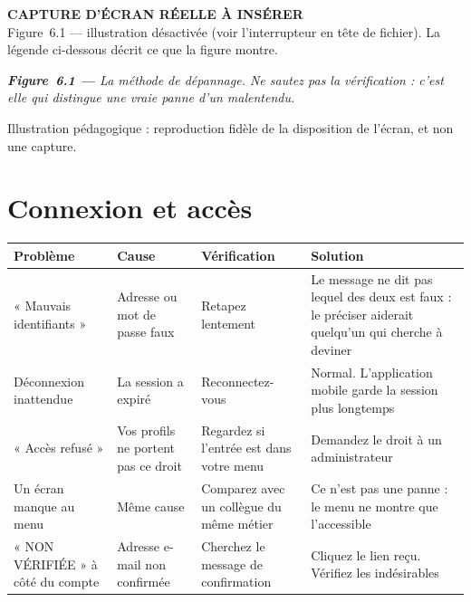 \documentclass[11pt,a4paper]{report}
\newif\ifillustrations
\newcounter{etape}[section]
\newcommand{\captureAInserer}[2][3.4cm]{%
  \begin{center}
  \begin{tcolorbox}[width=\linewidth,height=#1,
    colback=garahFond,colframe=garahAttenue,boxrule=0.9pt,arc=4pt,
    halign=center,valign=center]
    {\small\bfseries\color{garahAttenue}CAPTURE D'ÉCRAN RÉELLE À INSÉRER}\\[4pt]
    {\footnotesize\color{garahAttenue}#2}
  \end{tcolorbox}
  \end{center}
}
\newcommand{\legendeIllus}[2]{%
  \ifillustrations\else
    \captureAInserer[2.6cm]{Figure~#1 --- illustration désactivée
      (voir l'interrupteur en tête de fichier). La légende ci-dessous décrit
      ce que la figure montre.}%
  \fi
  \vspace{2pt}
  \begin{center}
  \begin{minipage}{0.93\linewidth}
    \footnotesize\itshape
    \textbf{Figure~#1 --- } #2
    \par\vspace{2pt}
    \textcolor{garahAttenue}{\scriptsize Illustration pédagogique : reproduction
    fidèle de la disposition de l'écran, et non une capture.}
  \end{minipage}
  \end{center}
  \vspace{6pt}
}
\begin{document}
\begin{illustration}
\begin{center}
\end{center}
\end{illustration}
\legendeIllus{6.1}{La méthode de dépannage. Ne sautez pas la vérification :
c'est elle qui distingue une vraie panne d'un malentendu.}

\section{Connexion et accès}

\begin{longtable}{@{}p{3.6cm} p{3.4cm} p{3.4cm} p{3.8cm}@{}}
\toprule
\bfseries Problème & \bfseries Cause & \bfseries Vérification & \bfseries Solution \\
\midrule
\endhead
« Mauvais identifiants »
  & Adresse ou mot de passe faux
  & Retapez lentement
  & Le message ne dit pas lequel des deux est faux : le préciser aiderait
    quelqu'un qui cherche à deviner \\[4pt]
Déconnexion inattendue
  & La session a expiré
  & Reconnectez-vous
  & Normal. L'application mobile garde la session plus longtemps \\[4pt]
« Accès refusé »
  & Vos profils ne portent pas ce droit
  & Regardez si l'entrée est dans votre menu
  & Demandez le droit à un administrateur \\[4pt]
Un écran manque au menu
  & Même cause
  & Comparez avec un collègue du même métier
  & Ce n'est pas une panne : le menu ne montre que l'accessible \\[4pt]
« NON VÉRIFIÉE » à côté du compte
  & Adresse e-mail non confirmée
  & Cherchez le message de confirmation
  & Cliquez le lien reçu. Vérifiez les indésirables \\
\bottomrule
\end{longtable}
\end{document}
